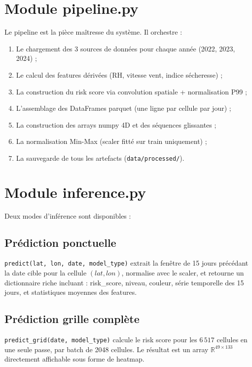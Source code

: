 \documentclass[12pt,a4paper]{report}
\begin{document}
\section{Module pipeline.py}

Le pipeline est la pièce maîtresse du système. Il orchestre :
\begin{enumerate}[leftmargin=*]
  \item Le chargement des 3 sources de données pour chaque année (2022, 2023, 2024) ;
  \item Le calcul des features dérivées (RH, vitesse vent, indice sécheresse) ;
  \item La construction du risk score via convolution spatiale + normalisation P99 ;
  \item L'assemblage des DataFrames parquet (une ligne par cellule par jour) ;
  \item La construction des arrays numpy 4D et des séquences glissantes ;
  \item La normalisation Min-Max (scaler fitté sur train uniquement) ;
  \item La sauvegarde de tous les artefacts (\texttt{data/processed/}).
\end{enumerate}

\section{Module inference.py}

Deux modes d'inférence sont disponibles :

\subsection{Prédiction ponctuelle}

\texttt{predict(lat, lon, date, model\_type)} extrait la fenêtre de 15 jours précédant
la date cible pour la cellule $(lat, lon)$, normalise avec le scaler, et retourne un
dictionnaire riche incluant : risk\_score, niveau, couleur, série temporelle des 15 jours,
et statistiques moyennes des features.

\subsection{Prédiction grille complète}

\texttt{predict\_grid(date, model\_type)} calcule le risk score pour les $6\,517$ cellules
en une seule passe, par batch de 2048 cellules. Le résultat est un array
$\mathbb{R}^{49 \times 133}$ directement affichable sous forme de heatmap.
\end{document}
